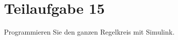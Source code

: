 \section{Teilaufgabe 15}
\begin{aufgabe}
Programmieren Sie den ganzen Regelkreis mit Simulink.
\end{aufgabe}
